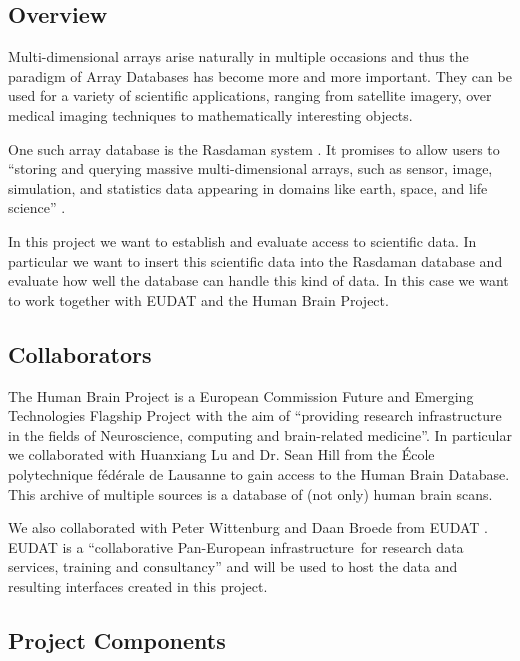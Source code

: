 \label{sec:intro}

\subsection{Overview}

Multi-dimensional arrays arise naturally in multiple occasions and thus the paradigm of Array Databases has become more and more important. They can be used for a variety of scientific applications, ranging from satellite imagery, over medical imaging techniques to mathematically interesting objects.

One such array database is the Rasdaman system \cite{rasdaman:intropaper}. It promises to allow users to ``storing and querying massive multi-dimensional arrays, such as sensor, image, simulation, and statistics data appearing in domains like earth, space, and life science'' \cite{rasdaman:website}.

In this project we want to establish and evaluate access to scientific data. In particular we want to insert this scientific data into the Rasdaman database and evaluate how well the database can handle this kind of data. In this case we want to work together with EUDAT and the Human Brain Project.

\subsection{Collaborators}

The Human Brain Project \cite{hbp:website} is a European Commission Future and Emerging Technologies Flagship Project with the aim of ``providing research infrastructure in the fields of Neuroscience, computing and brain-related medicine''. In particular we collaborated with Huanxiang Lu and Dr. Sean Hill from the École polytechnique fédérale de Lausanne to gain access to the Human Brain Database. This archive of multiple sources is a database of (not only) human brain scans.

We also collaborated with Peter Wittenburg and Daan Broede from EUDAT \cite{eudat:website}. EUDAT is a ``collaborative Pan-European infrastructure for research data services, training and consultancy'' and will be used to host the data and resulting interfaces created in this project.

\subsection{Project Components}

